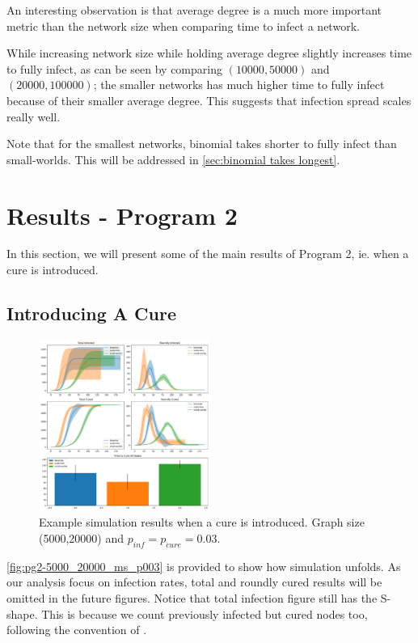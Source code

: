\documentclass[conference]{IEEEtran}
\begin{document}
An interesting observation is that average degree is a much more important metric than the network size when comparing time to infect a network.

While increasing network size while holding average degree slightly increases time to fully infect, as can be seen by comparing $(10000,50000)$ and $(20000,100000)$; the smaller networks has much higher time to fully infect because of their smaller average degree. This suggests that infection spread scales really well.

Note that for the smallest networks, binomial takes shorter to fully infect than small-worlds. This will be addressed in \autoref{sec:binomial takes longest}.



\section{Results - Program 2}\label{sec:pg2-res}

In this section, we will present some of the main results of Program 2, ie. when a cure is introduced.

\subsection{Introducing A Cure}

\begin{figure}[htb]
  \begin{center}
	\includegraphics[width=0.5\textwidth]{img/pg2-5000_20000_ms_p003.pdf}
  \end{center}
	\caption{Example simulation results when a cure is introduced. Graph size (5000,20000) and $p_{inf} = p_{cure} = 0.03$.}
	\label{fig:pg2-5000_20000_ms_p003}
\end{figure}

\autoref{fig:pg2-5000_20000_ms_p003} is provided to show how simulation unfolds. As our analysis focus on infection rates, total and roundly cured results will be omitted in the future figures.
Notice that total infection figure still has the S-shape. This is because we count previously infected but cured nodes too, following the convention of \cite{redcode}.
\end{document}
